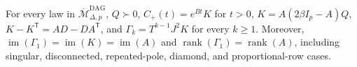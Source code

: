 For every law in \(\overline{\mathcal M}_{\Delta,p}^{\mathrm{DAG}}\), \(Q\succ0\), \(C_{+}(t)=e^{Bt}K\) for \(t>0\), \(K=A(2\beta I_p-A)Q\), \(K-K^{\mathsf T}=AD-DA^{\mathsf T}\), and \(\Gamma_k=T^{k-1}J^2K\) for every \(k\geq1\). Moreover, \(\operatorname{im}(\Gamma_1)=\operatorname{im}(K)=\operatorname{im}(A)\) and \(\operatorname{rank}(\Gamma_1)=\operatorname{rank}(A)\), including singular, disconnected, repeated-pole, diamond, and proportional-row cases.